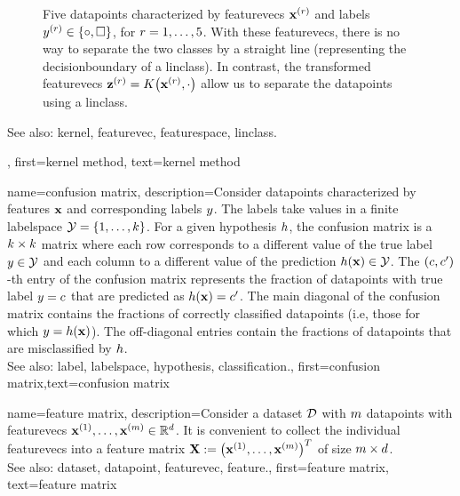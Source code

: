 {{\begin{figure}[H]
\begin{center}
\end{center}
\caption{
Five \glspl{datapoint} characterized by \glspl{featurevec} ${\bf x}^{(r)}$ 
and \glspl{label} $y^{(r)} \in \{ \circ, \square \}$, for $r=1, \ldots, 5$. 
With these \glspl{featurevec}, there is no way to separate the two classes 
by a straight line (representing the \gls{decisionboundary} of a \gls{linclass}). 
In contrast, the transformed \glspl{featurevec} ${\bf z}^{(r)} = K\big({\bf x}^{(r)},\cdot\big)$ 
allow us to separate the \glspl{datapoint} using a \gls{linclass}.  \label{fig_linsep_kernel_dict}}
\end{figure}
		See also: \gls{kernel}, \gls{featurevec}, \gls{featurespace}, \gls{linclass}.},
	first={kernel method},
	text={kernel method} 
}

	

{name={confusion matrix}, 
 description={Consider \glspl{datapoint} characterized 
		by \glspl{feature} ${\bf x}$ and corresponding \glspl{label} $y$. 
		The labels take values in a finite \gls{labelspace} $\mathcal{Y} = \{1, \ldots, k\}$. 
		For a given \gls{hypothesis} $h$, the confusion matrix is a 
		$k \times k$ matrix where each row corresponds to a different 
		value of the true \gls{label} $y \in \mathcal{Y}$ and each column to a 
		different value of the \gls{prediction} $h({\bf x}) \in \mathcal{Y}$. 
		The $(c,c')$-th entry of the confusion matrix represents the fraction of 
		\glspl{datapoint} with true \gls{label} $y = c$ that are predicted as 
		$h({\bf x}) = c'$. The main diagonal of the confusion matrix 
		contains the fractions of correctly classified \glspl{datapoint} (i.e, those for which 
		$y = h({\bf x})$). The off-diagonal entries contain the fractions of
		\glspl{datapoint} that are misclassified by $h$.
 				\\
		See also: \gls{label}, \gls{labelspace}, \gls{hypothesis}, \gls{classification}.},
	first={confusion matrix},text={confusion matrix} }


{name={feature matrix}, 
	description={Consider a \gls{dataset} $\mathcal{D}$ 
		with $m$ \glspl{datapoint} with \glspl{featurevec} ${\bf x}^{(1)}, \ldots, {\bf x}^{(m)} \in \mathbb{R}^{d}$. It is convenient to 
		collect the individual \glspl{featurevec} into a \gls{feature} 
		matrix ${\bf X} := \big({\bf x}^{(1)}, \ldots, {\bf x}^{(m)}\big)^{T}$ 
		of size $m \times d$.
				\\
		See also: \gls{dataset}, \gls{datapoint}, \gls{featurevec}, \gls{feature}.},
	first={feature matrix},
	text={feature matrix} 
}

